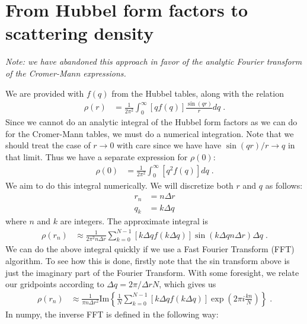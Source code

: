 \documentclass[11pt]{article}
\begin{document}
\section{From Hubbel form factors to scattering density}

\emph{Note: we have abandoned this approach in favor of the analytic Fourier 
transform of the Cromer-Mann expressions.}

We are provided with $f(q)$ from the Hubbel tables, along with the relation 
\begin{align}
  \rho(r) &= \frac{1}{2 \pi^2} \int_0^\infty     [q f(q)]  \frac{\sin(qr)}{r}dq  \;. \label{eqn:trans}
\end{align}
Since we cannot do an analytic integral of the Hubbel form factors as we
can do for the Cromer-Mann tables, we must do a numerical integration.
Note that we should treat the case of $r\rightarrow 0$ with care since we have have $\sin(qr)/r \rightarrow q$ in that limit.  Thus we have
a separate expression for $\rho(0)$:
\begin{align}
  \rho(0) &= \frac{1}{2 \pi^2} \int_0^\infty     [q^2 f(q)]  dq  \;. \label{eqn:trans0}
\end{align}
We aim to do this integral numerically.  We will discretize both $r$ and $q$ as follows:
\begin{align}
r_n &= n\Delta r \\
q_k &= k \Delta q
\end{align}
where $n$ and $k$ are integers.  The approximate integral is
\begin{align}
\rho(r_n) &\approx  \frac{1}{2 \pi^2 n\Delta r }\sum_{k=0}^{N-1}
[k \Delta q f(k \Delta q)]  \sin(k \Delta q n\Delta r) \Delta q \; .
\end{align}
We can do the above integral quickly if we use a Fast Fourier Transform (FFT) algorithm.  To see how this is done,
firstly note that the sin transform above is just the imaginary part of the Fourier Transform.  With some foresight, we
relate our gridpoints according to $\Delta q  = 2\pi / \Delta r N$, which gives us
\begin{align}
\rho(r_n) &\approx  \frac{1}{ \pi n\Delta r^2 }\text{Im}\left\{ \frac{1}{N}\sum_{k=0}^{N-1}
[k \Delta q f(k \Delta q)]  \exp\left(2\pi i \frac{ k  n}{N}\right) \right\} \; .
\end{align}
In numpy, the inverse FFT is defined in the following way:
\end{document}
